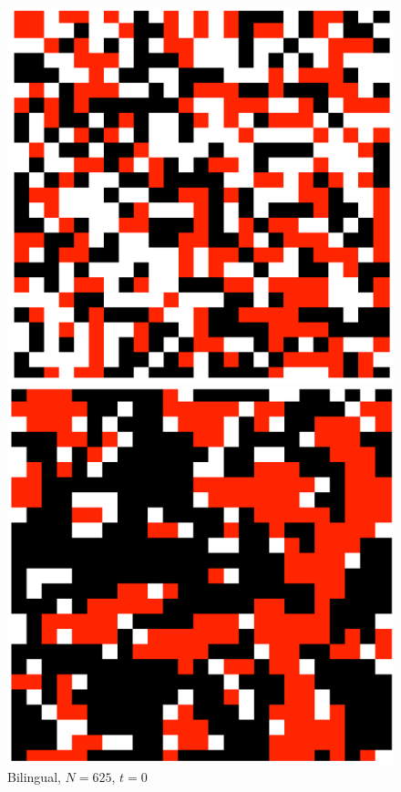 \begin{figure}[h]
\centering
\begin{minipage}[t]{0.43\linewidth}
    \centering
    \includegraphics[width=\textwidth]{images/task1/regular_net_bi_t=1.png} 
    \caption{\scriptsize Bilingual, \(N=625\), \(t=0\)}
    \label{reg_net_bi1}
\end{minipage}
\hfill
\begin{minipage}[t]{0.43\linewidth}
    \centering
    \includegraphics[width=\textwidth]{images/task1/regular_net_bi_t=5000.png} 

\end{minipage}
\end{figure}
